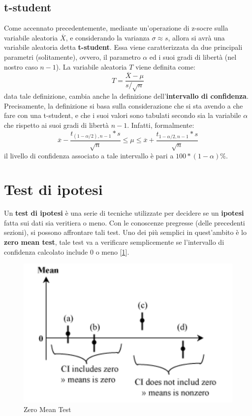 \subsection{t-student}
Come accennato precedentemente, mediante un'operazione di z-socre sulla variabile aleatoria \(\overline{X}\), e considerando la varianza \(\sigma \approx s\), allora si avrà una variabile aleatoria detta \textbf{t-student}. Essa viene caratterizzata da due principali parametri (solitamente), ovvero, il parametro \(\alpha\) ed i suoi gradi di libertà (nel nostro caso \(n-1\)). La variabile aleatoria \(T\) viene definita come:
\[
T = \frac{\overline{X} - \mu}{s/\sqrt{n}}
\]
data tale definizione, cambia anche la definizione dell'\textbf{intervallo di confidenza}. Precisamente, la definizione si basa sulla considerazione che si sta avendo a che fare con una t-student, e che i suoi valori sono tabulati secondo sia la variabile \(\alpha\) che rispetto ai suoi gradi di libertà \(n-1\). Infatti, formalmente:
\[
\overline{x} - \frac{t_{(1-\alpha/2),n-1} * s}{\sqrt{n}} \leq \mu \leq \overline{x} + \frac{t_{1-\alpha/2,n-1} * s}{\sqrt{n}}
\]
il livello di confidenza associato a tale intervallo è pari a \(100*(1-\alpha)\%\).

\clearpage
\section{Test di ipotesi}
Un \textbf{test di ipotesi} è una serie di tecniche utilizzate per decidere se un \textbf{ipotesi} fatta sui dati sia veritiera o meno. Con le conoscenze pregresse (delle precedenti sezioni), si possono affrontare tali test. Uno dei più semplici in quest'ambito è lo \textbf{zero mean test}, tale test va a verificare semplicemente se l'intervallo di confidenza calcolato include 0 o meno [\ref{img:zero-mean}].

\begin{figure}[h]
\centering
\includegraphics[width=.7\textwidth]{img/chapter-4/zero-mean.png}
\caption{Zero Mean Test}\label{img:zero-mean}
\end{figure}

